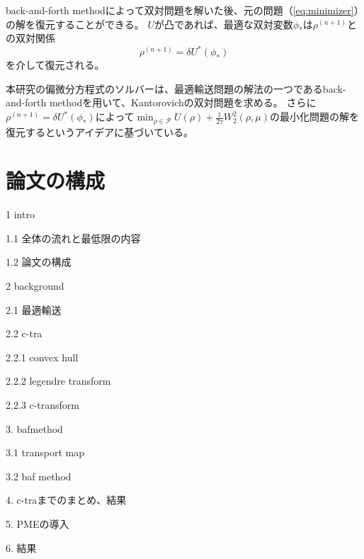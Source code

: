 back-and-forth methodによって双対問題を解いた後、元の問題（\ref{eq:minimizer}）の解を復元することができる。
$U$が凸であれば、最適な双対変数$\phi_*$は$\rho^{(n+1)}$との双対関係
$$
    \rho^{(n+1)} = \delta U^*(\phi_*)
$$
を介して復元される。

本研究の偏微分方程式のソルバーは、最適輸送問題の解法の一つであるback-and-forth methodを用いて、Kantorovichの双対問題を求める。
さらに$\rho^{(n+1)} = \delta U^*(\phi_*)$によって$\min_{\rho \in \mathcal{P}} U(\rho) + \frac{1}{2\tau} W_2^2(\rho, \mu)$の最小化問題の解を復元するというアイデアに基づいている。

\section{論文の構成}
\label{sect:論文の構成}
1 intro

1.1 全体の流れと最低限の内容

1.2 論文の構成

2 background

2.1 最適輸送

2.2 c-tra

2.2.1 convex hull

2.2.2 legendre transform

2.2.3 c-transform

3. bafmethod

3.1 transport map

3.2 baf method

4. c-traまでのまとめ、結果

5. PMEの導入

6. 結果